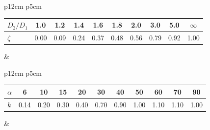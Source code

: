 \begin{tabular}[t]{p{12cm} p{5cm}}
	\begin{tabular}{l c c c c c c c c c}
		$D_2/D_1$ & 1.0 & 1.2 & 1.4 & 1.6 & 1.8 & 2.0 & 3.0 & 5.0 & $\infty$ \\ 
		\hline
		$\zeta$    & 0.00    & 0.09    & 0.24      & 0.37    & 0.48     & 0.56 & 0.79 & 0.92 & 1.00 \\
	\end{tabular}
	&
	\vfill
\end{tabular}
\vspace{1cm}

\begin{tabular}[t]{p{12cm} p{5cm}}
	\begin{tabular}{l c c c c c c c c c c}
		$\alpha$ & 6\deg & 10\deg & 15\deg & 20\deg & 30\deg & 40\deg & 50\deg & 60\deg & 70\deg & 90\deg \\ 
		\hline
		$k$    & 0.14    & 0.20    & 0.30      & 0.40    & 0.70     & 0.90 & 1.00 & 1.10 & 1.10 & 1.00 \\
	\end{tabular}
	&
	\vfill
\end{tabular}
\vspace{1cm}

